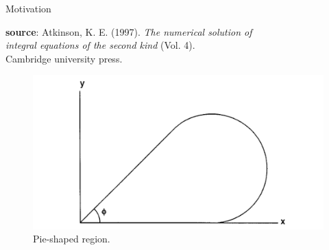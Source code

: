 \documentclass{beamer}
\begin{document}
\begin{frame}[t,fragile]{Motivation}
\begin{itemize}
\end{itemize}
  \tiny
  \vspace{10pt}
  \hspace{10pt}
   \textbf{source}: Atkinson, K. E. (1997).
    \emph{The numerical solution of \\
  \hspace{10pt}
    integral equations of the second kind} (Vol. 4). \\
  \hspace{10pt}
    Cambridge university press.
\begin{figure}
    \centering
    \vspace{-55pt}
    \includegraphics[width=.3\textwidth]{pie.png}
    \vspace{-8pt}
    \caption{\footnotesize Pie-shaped region.}
\end{figure}
\end{frame}
\end{document}
